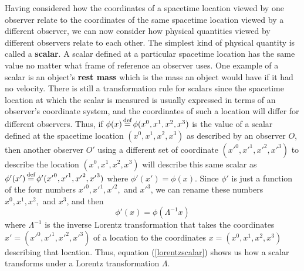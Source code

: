 Having considered how the coordinates of a spacetime location viewed by one observer relate to the coordinates of the same spacetime location viewed by a different observer, we can now consider how physical quantities viewed by different observers relate to each other. The simplest kind of physical quantity is called a \textbf{scalar}. A scalar defined at a particular spacetime location has the same value no matter what frame of reference an observer uses. One example of a scalar is an object's \textbf{rest mass} which is the mass an object would have if it had no velocity. There is still a transformation rule for scalars since the spacetime location at which the scalar is measured is usually expressed in terms of an observer's coordinate system, and the coordinates of  such a location  will differ for different observers. Thus, if $\phi(x)\myeq\phi(x^0, x^1, x^2, x^3)$ is the value of a scalar defined at the spacetime location $(x^0, x^1, x^2, x^3)$ as described by an observer $O$, then another observer $O'$ using a different set of coordinate $({x'}^0, {x'}^1, {x'}^2, {x'}^3)$ to describe the location $(x^0, x^1, x^2, x^3)$ will describe this same scalar as $\phi'(x')\myeq\phi'({x'}^0, {x'}^1, {x'}^2, {x'}^3)$  where $\phi'(x')=\phi(x)$. Since $\phi'$ is just a function of the four numbers ${x'}^0, {x'}^1, {x'}^2,$ and ${x'}^3$, we can rename these numbers ${x}^0, {x}^1, {x}^2,$ and ${x}^3$, and then 
\begin{equation}\label{lorentzscalar}
\phi'(x)=\phi(\Lambda^{-1}x)
\end{equation} 
where $\Lambda^{-1}$ is the inverse Lorentz transformation that takes the coordinates $x'=({x'}^0, {x'}^1, {x'}^2, {x'}^3)$ of a location to the coordinates $x=(x^0, x^1, x^2, x^3)$ describing that location. Thus, equation (\ref{lorentzscalar}) shows us how a scalar transforms under a Lorentz transformation $\Lambda$. 

